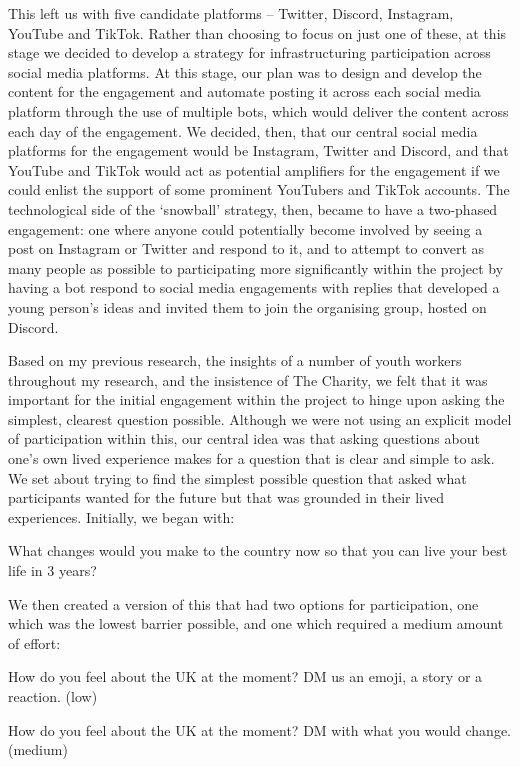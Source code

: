 This left us with five candidate platforms – Twitter, Discord, Instagram, YouTube and TikTok. Rather than choosing to focus on just one of these, at this stage we decided to develop a strategy for infrastructuring participation across social media platforms. At this stage, our plan was to design and develop the content for the engagement and automate posting it across each social media platform through the use of multiple bots, which would deliver the content across each day of the engagement. We decided, then, that our central social media platforms for the engagement would be Instagram, Twitter and Discord, and that YouTube and TikTok would act as potential amplifiers for the engagement if we could enlist the support of some prominent YouTubers and TikTok accounts. The technological side of the ‘snowball’ strategy, then, became to have a two-phased engagement: one where anyone could potentially become involved by seeing a post on Instagram or Twitter and respond to it, and to attempt to convert as many people as possible to participating more significantly within the project by having a bot respond to social media engagements with replies that developed a young person’s ideas and invited them to join the organising group, hosted on Discord. 
	
Based on my previous research, the insights of a number of youth workers throughout my research, and the insistence of The Charity, we felt that it was important for the initial engagement within the project to hinge upon asking the simplest, clearest question possible. Although we were not using an explicit model of participation within this, our central idea was that asking questions about one’s own lived experience makes for a question that is clear and simple to ask. We set about trying to find the simplest possible question that asked what participants wanted for the future but that was grounded in their lived experiences. Initially, we began with:
	
What changes would you make to the country now so that you can live your best life in 3 years?

We then created a version of this that had two options for participation, one which was the lowest barrier possible, and one which required a medium amount of effort:

How do you feel about the UK at the moment? DM us an emoji, a story or a reaction. (low)

How do you feel about the UK at the moment? DM with what you would change. (medium)

